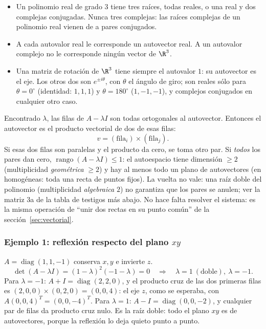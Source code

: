 \begin{resultado}
\begin{itemize}
  \item Un polinomio real de grado \(3\) tiene tres raíces, todas reales, o una real y dos
  complejas conjugadas. Nunca tres complejas: las raíces complejas de un polinomio real
  vienen de a pares conjugados.
  \item A cada autovalor real le corresponde un autovector real. A un autovalor complejo no
  le corresponde ningún vector de \(\R^3\).
  \item Una matriz de rotación de \(\R^3\) tiene siempre el autovalor \(1\): su autovector es
  el eje. Los otros dos son \(e^{\pm i\theta}\), con \(\theta\) el ángulo de giro; son reales
  sólo para \(\theta=0^\circ\) (identidad: \(1,1,1\)) y \(\theta=180^\circ\) (\(1,-1,-1\)),
  y complejos conjugados en cualquier otro caso.
\end{itemize}
\end{resultado}

\begin{idea}
Encontrado \(\lambda\), las filas de \(A-\lambda I\) son todas ortogonales al autovector.
Entonces el autovector es el producto vectorial de dos de esas filas:
\[
  v=(\text{fila}_i)\times(\text{fila}_j) .
\]
Si esas dos filas son paralelas y el producto da cero, se toma otro par. Si \emph{todos} los
pares dan cero, \(\operatorname{rango}(A-\lambda I)\le1\): el autoespacio tiene dimensión
\(\ge2\) (multiplicidad \emph{geométrica} \(\ge2\)) y hay al menos todo un plano de
autovectores (en homogéneas: toda una recta de puntos fijos). La vuelta no vale: una raíz
doble del polinomio (multiplicidad \emph{algebraica} \(2\)) no garantiza que los pares se
anulen; ver la matriz 3a de la tabla de testigos más abajo. No hace falta resolver el sistema: es la
misma operación de ``unir dos rectas en su punto común'' de la sección~\ref{sec:vectorial}.
\end{idea}

\subsubsection{Ejemplo 1: reflexión respecto del plano \texorpdfstring{$xy$}{xy}}

\(A=\operatorname{diag}(1,1,-1)\) conserva \(x,y\) e invierte \(z\).
\[
  \det(A-\lambda I)=(1-\lambda)^2(-1-\lambda)=0
  \quad\Longrightarrow\quad\lambda=1\ (\text{doble}),\ \lambda=-1 .
\]
Para \(\lambda=-1\): \(A+I=\operatorname{diag}(2,2,0)\), y el producto cruz de las dos
primeras filas es \((2,0,0)\times(0,2,0)=(0,0,4)\): el eje \(z\), como se esperaba, con
\(A(0,0,4)^T=(0,0,-4)^T\). Para \(\lambda=1\): \(A-I=\operatorname{diag}(0,0,-2)\), y
cualquier par de filas da producto cruz nulo. Es la raíz doble: todo el plano \(xy\) es de
autovectores, porque la reflexión lo deja quieto punto a punto.

